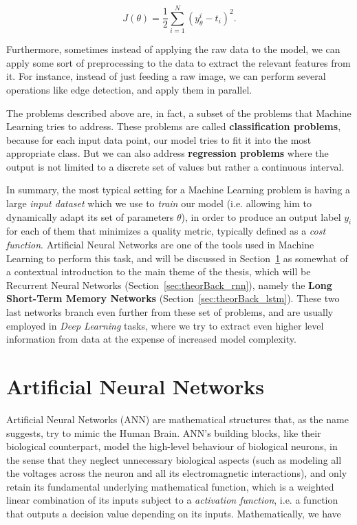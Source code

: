 \begin{equation}\label{eq:costfunctionFund}
	J(\theta) = \frac{1}{2} \sum_{i=1}^N \left( y_{\theta}^i - t_i \right)^2.
\end{equation}

Furthermore, sometimes instead of applying the raw data to the model, we can apply some sort of preprocessing to the data to extract the relevant features from it. For instance, instead of just feeding a raw image, we can perform several operations like edge detection, and apply them in parallel.

The problems described above are, in fact, a subset of the problems that Machine Learning tries to address. These problems are called \textbf{classification problems}, because for each input data point, our model tries to fit it into the most appropriate class. But we can also address \textbf{regression problems} where the output is not limited to a discrete set of values but rather a continuous interval. 

In summary, the most typical setting for a Machine Learning problem is having a large \textit{input dataset} which we use to \textit{train} our model (i.e. allowing him to dynamically adapt its set of parameters $\theta$), in order to produce an output label $y_i$ for each of them that minimizes a quality metric, typically defined as a \textit{cost function}. Artificial Neural Networks are one of the tools used in Machine Learning to perform this task, and will be discussed in Section~\ref{sec:theorBack_ann} as somewhat of a contextual introduction to the main theme of the thesis, which will be Recurrent Neural Networks (Section~\ref{sec:theorBack_rnn}), namely the \textbf{Long Short-Term Memory Networks} (Section~\ref{sec:theorBack_lstm}). These two last networks branch even further from these set of problems, and are usually employed in \textit{Deep Learning} tasks, where we try to extract even higher level information from data at the expense of increased model complexity. 

\section{Artificial Neural Networks}\label{sec:theorBack_ann}

Artificial Neural Networks (ANN) are mathematical structures that, as the name suggests, try to mimic the Human Brain. ANN's building blocks, like their biological counterpart, model the high-level behaviour of biological neurons, in the sense that they neglect unnecessary biological aspects (such as modeling all the voltages across the neuron and all its electromagnetic interactions), and only retain its fundamental underlying mathematical function, which is a weighted linear combination of its inputs subject to a \emph{activation function}, i.e. a function that outputs a decision value depending on its inputs.  Mathematically, we have

